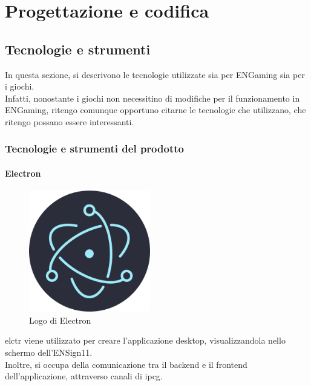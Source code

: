\chapter{Progettazione e codifica}
\label{cap:progettazione-codifica}

\section{Tecnologie e strumenti}
\label{sec:tecnologie-strumenti}

In questa sezione, si descrivono le tecnologie utilizzate sia per ENGaming sia per i giochi.\\
Infatti, nonostante i giochi non necessitino di modifiche per il funzionamento in ENGaming, ritengo comunque opportuno citarne le tecnologie che utilizzano, che ritengo possano essere interessanti.

\subsection{Tecnologie e strumenti del prodotto}

\subsubsection{Electron}
\begin{figure}[h]
    \centering
    \includegraphics[width=150pt]{images/technologies/electron.png}
    \caption{Logo di Electron}
    \label{fig:electron}
\end{figure}
\gls{elctr} viene utilizzato per creare l'applicazione desktop, visualizzandola nello schermo dell'ENSign11.\\
Inoltre, si occupa della comunicazione tra il backend e il frontend dell'applicazione, attraverso canali di \gls{ipcg}.

